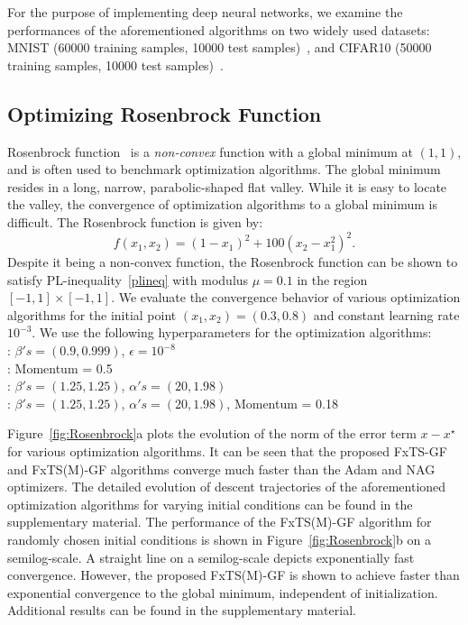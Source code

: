 \documentclass[letterpaper]{article}
\begin{document}
 For the purpose of implementing deep neural networks, we examine the performances of the aforementioned algorithms on two widely used datasets: MNIST (60000 training samples, 10000 test samples)~\cite{lecun1998gradient}, and CIFAR10 (50000 training samples, 10000 test samples)~\cite{krizhevsky2009learning}.

\subsection{Optimizing Rosenbrock Function}\label{subsec:Rosenbrock}
Rosenbrock function~\cite{rosenbrock1960automatic} is a \emph{non-convex} function with a global minimum at $(1,1)$, and is often used to benchmark optimization algorithms. The global minimum resides in a long, narrow, parabolic-shaped flat valley. While it is easy to locate the valley, the convergence of optimization algorithms to a global minimum is difficult. The Rosenbrock function is given by:
\begin{equation*}
	f(x_1,x_2) = (1 - x_1)^2 + 100(x_2 - x_1^2)^2.
\end{equation*}
Despite it being a non-convex function, the Rosenbrock function can be shown to satisfy PL-inequality~\eqref{plineq} with modulus $\mu=0.1$ in the region $[-1,1]\times[-1,1]$. We evaluate the convergence behavior of various optimization algorithms for the initial point $(x_1,x_2)=(0.3,0.8)$ and constant learning rate $10^{-3}$. We use the following hyperparameters for the optimization algorithms:\\
: $\beta'{s} = (0.9, 0.999)$, $\epsilon = 10^{-8}$\\
: Momentum = 0.5\\
: $\beta'{s} = (1.25, 1.25)$, $\alpha'{s} = (20, 1.98)$\\
: $\beta'{s} = (1.25, 1.25)$, $\alpha'{s} = (20, 1.98)$, Momentum = 0.18

Figure~\ref{fig:Rosenbrock}a plots the evolution of the norm of the error term $x-x^\star$ for various optimization algorithms. It can be seen that the proposed FxTS-GF and FxTS(M)-GF algorithms converge much faster than the Adam and NAG optimizers. The detailed evolution of descent trajectories of the aforementioned optimization algorithms for varying initial conditions can be found in the supplementary material. The performance of the FxTS(M)-GF algorithm for randomly chosen initial conditions is shown in Figure~\ref{fig:Rosenbrock}b on a semilog-scale. A straight line on a semilog-scale depicts exponentially fast convergence. However, the proposed FxTS(M)-GF is shown to achieve faster than exponential convergence to the global minimum, independent of initialization. Additional results can be found in the supplementary material.
\end{document}
